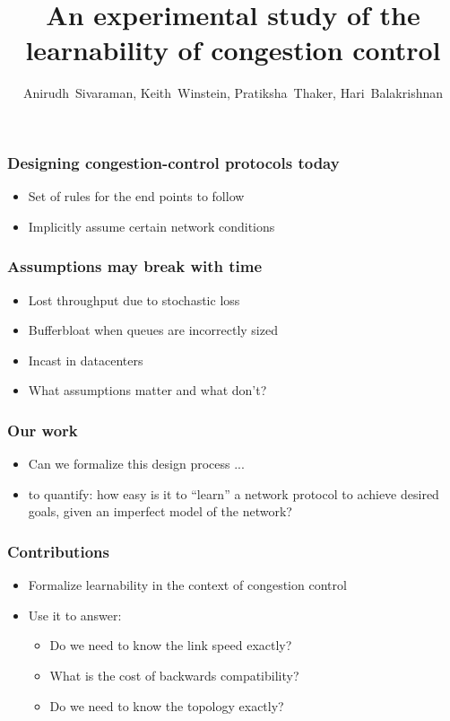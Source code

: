 \documentclass[svgnames]{beamer}
\title{An experimental study of the learnability of congestion control}
\author{Anirudh~Sivaraman, Keith~Winstein, Pratiksha~Thaker, Hari~Balakrishnan}
\institute{MIT CSAIL\vspace{\baselineskip}}
\begin{document}
\begin{frame}

\titlepage

\end{frame}

\begin{Large}
\begin{frame}
\frametitle{Designing congestion-control protocols today}
\begin{itemize}
\item<2-> Set of rules for the end points to follow
\item<3-> Implicitly assume certain network conditions
\end{itemize}
\end{frame}

\begin{frame}
\frametitle{Assumptions may break with time}
\begin{itemize}
\item Lost throughput due to stochastic loss 
\item Bufferbloat when queues are incorrectly sized
\item Incast in datacenters
\item<2-> What assumptions matter and what don't?
\end{itemize}
\end{frame}

\begin{frame}
\frametitle{Our work}
\begin{itemize}
\item<1-> Can we formalize this design process ...
\item<2-> to quantify: how easy is it to “learn” a network protocol to achieve desired goals, given
an imperfect model of the network?
\end{itemize}
\end{frame}

\begin{frame}
\frametitle{Contributions}
\begin{itemize}
\item Formalize learnability in the context of congestion control
\item Use it to answer:
\begin{itemize}
\item Do we need to know the link speed exactly?
\item What is the cost of backwards compatibility?
\item Do we need to know the topology exactly?
\end{itemize}
\end{itemize}
\end{frame}


\end{Large}
\end{document}
